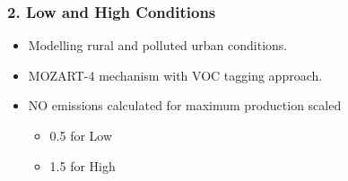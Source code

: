 {
    \begin{frame}[plain]
    \end{frame}
}

\begin{frame}
    \frametitle{2. Low and High  Conditions}

    \vspace{-5mm}
    \begin{itemize}
        \item Modelling rural and polluted urban conditions. \vspace{5mm}
        \item MOZART-4 mechanism with VOC tagging approach. \vspace{5mm}
        \item NO emissions calculated for maximum  production scaled 
            \begin{itemize}
                \item 0.5 for Low 
                \item 1.5 for High 
            \end{itemize}
    \end{itemize}
\end{frame}

